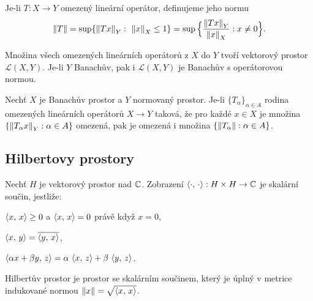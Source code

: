 \begin{definition}
\label{def:norma-operatoru}
Je-li $T:X\to Y$ omezený lineární operátor, definujeme jeho normu
\[
\left\lVert T \right\rVert=\sup\{\left\lVert Tx \right\rVert_Y:\ \left\lVert x \right\rVert_X\le1\}
       =\sup\Big\{\frac{\left\lVert Tx \right\rVert_Y}{\left\lVert x \right\rVert_X}: x\ne0\Big\}.
\]
\end{definition}

\begin{definition}
\label{def:prostor-operatoru}
Množina všech omezených lineárních operátorů z $X$ do $Y$ tvoří vektorový prostor $\mathcal{L}(X,Y)$. Je-li $Y$ Banachův, pak i $\mathcal{L}(X,Y)$ je Banachův s operátorovou normou.
\end{definition}

\begin{theorem}
\label{vet:princip-stejnomerne-omezenosti}
Nechť $X$ je Banachův prostor a $Y$ normovaný prostor. Je-li $\{T_\alpha\}_{\alpha\in A}$ rodina omezených lineárních operátorů $X\to Y$ taková, že pro každé $x\in X$ je množina $\{\left\lVert T_\alpha x \right\rVert_Y:\alpha\in A\}$ omezená, pak je omezená i množina $\{\left\lVert T_\alpha \right\rVert:\alpha\in A\}$.
\end{theorem}

\spc

\subsection{Hilbertovy prostory}
\label{subsec:hilbert-prostory}

\begin{definition}
\label{def:skalarni-soucin}
Nechť $H$ je vektorový prostor nad $\mathbb{C}$. Zobrazení $\left\langle \cdot,\, \cdot \right\rangle:H\times H\to\mathbb{C}$ je skalární součin, jestliže:
\begin{romanenum}
\item $\left\langle x,\, x \right\rangle\ge 0$ a $\left\langle x,\, x \right\rangle=0$ právě když $x=0$,
\item $\left\langle x,\, y \right\rangle=\overline{\left\langle y,\, x \right\rangle}$,
\item $\left\langle \alpha x+\beta y,\, z \right\rangle=\alpha\,\left\langle x,\, z \right\rangle+\beta\,\left\langle y,\, z \right\rangle$.
\end{romanenum}
\end{definition}

\begin{definition}
\label{def:hilbert-prostor}
Hilbertův prostor je prostor se skalárním součinem, který je úplný v metrice indukované normou $\left\lVert x \right\rVert=\sqrt{\left\langle x,\, x \right\rangle}$.
\end{definition}

